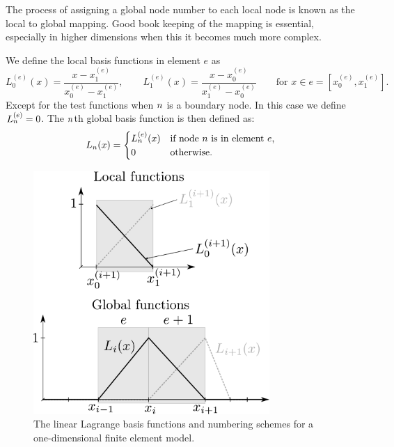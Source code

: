 The process of assigning a global node number to each local node is known as the local to global mapping.
Good book keeping of the mapping is essential, especially in higher dimensions when this it becomes much more complex.

We define the local basis functions in element $e$ as
\begin{equation}
  L_{0}^{(e)}(x)=\dfrac{x-x_{1}^{(e)}}{x_{0}^{(e)}-x_{1}^{(e)}},\qquad
  L_{1}^{(e)}(x)=\dfrac{x-x_{0}^{(e)}}{x_{1}^{(e)}-x_{0}^{(e)}}
  \qquad\text{for }x\in e=[x_{0}^{(e)},x_{1}^{(e)}].
  \label{eq:32}
\end{equation}
Except for the test functions when $n$ is a boundary node.
In this case we define $L_n^{(e)} = 0$.
The $n$th global basis function is then defined as:
\begin{equation}
  \label{eq:33}
  L_n(x) =
  \begin{cases}
    L_n^{(e)}(x) & \text{if node $n$ is in element $e$,} \\
    0 & \text{otherwise.}
  \end{cases}
\end{equation}

\begin{figure}
  \center
  \includegraphics[width=0.8\textwidth]{./images/local_global_functions}
  \caption{The linear Lagrange basis functions and numbering schemes for a one-dimensional
    finite element model.\label{fig:local_global_functions}}
\end{figure}

